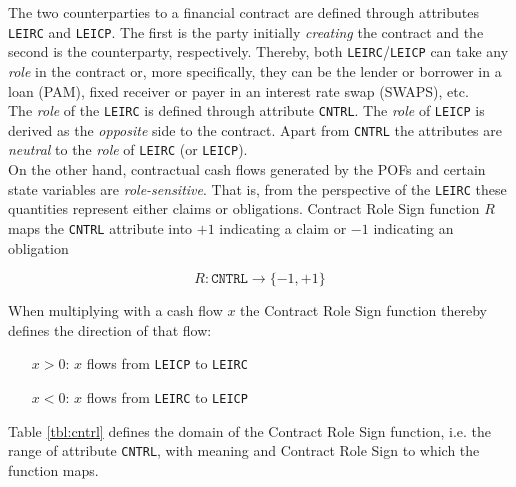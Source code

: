 \documentclass[9pt,oneside]{amsart}
\newcommand{\attr}[1]{\texttt{#1}}
\begin{document}
\begin{multicols}{2}
The two counterparties to a financial contract are defined through attributes \attr{LEIRC} and \attr{LEICP}. The first is the party initially \textit{creating} the contract and the second is the counterparty, respectively. Thereby, both \attr{LEIRC}/\attr{LEICP} can take any \textit{role} in the contract or, more specifically, they can be the lender or borrower in a loan (PAM), fixed receiver or payer in an interest rate swap (SWAPS), etc.\\

The \textit{role} of the \attr{LEIRC} is defined through attribute \attr{CNTRL}. The \textit{role} of \attr{LEICP} is derived as the \textit{opposite} side to the contract. Apart from \attr{CNTRL} the attributes are \textit{neutral} to the \textit{role} of \attr{LEIRC} (or \attr{LEICP}).\\

On the other hand, contractual cash flows generated by the POFs and certain state variables are \textit{role-sensitive}. That is, from the perspective of the \attr{LEIRC} these quantities represent either claims or obligations. Contract Role Sign function $R$ maps the \attr{CNTRL} attribute into $+1$ indicating a claim or $-1$ indicating an obligation

\[
	R : \attr{CNTRL} \rightarrow \{-1, +1 \}
\]

When multiplying with a cash flow $x$ the Contract Role Sign function thereby defines the direction of that flow:

\begin{itemize}
	\item[$x>0$:] $x$ flows from \attr{LEICP} to \attr{LEIRC}
	
	\item[$x<0$:] $x$ flows from \attr{LEIRC} to \attr{LEICP}
\end{itemize}

Table \ref{tbl:cntrl} defines the domain of the Contract Role Sign function, i.e. the range of attribute \attr{CNTRL}, with meaning and Contract Role Sign to which the function maps.



\end{multicols}
\end{document}

